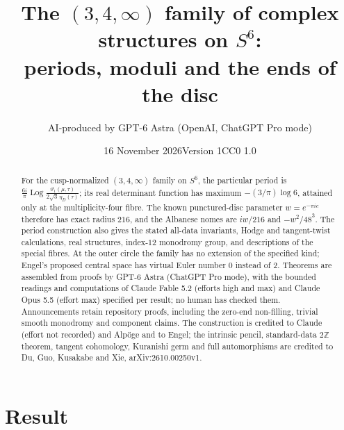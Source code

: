 \documentclass[11pt,a4paper]{article}
\title{The $(3,4,\infty)$ family of complex structures on $S^6$:\\periods, moduli and the ends of the disc}
\author{AI-produced by GPT-6 Astra (OpenAI, ChatGPT Pro mode)}
\date{16 November 2026\qquad Version 1\qquad CC0 1.0}
\theoremstyle{plain}
\theoremstyle{definition}
\begin{document}
\maketitle

\begin{abstract}
For the cusp-normalized $(3,4,\infty)$ family on $S^6$, the particular period is $\frac{6i}{\pi}\operatorname{Log}\frac{\vartheta_1(\mu,\tau)}{2\sqrt3\,\eta_D(\tau)}$; its real determinant function has maximum $-(3/\pi)\log6$, attained only at the multiplicity-four fibre. The known punctured-disc parameter $w=e^{-\pi ic}$ therefore has exact radius $216$, and the Albanese nomes are $iw/216$ and $-w^2/48^3$. The period construction also gives the stated all-data invariants, Hodge and tangent-twist calculations, real structures, index-$12$ monodromy group, and descriptions of the special fibres. At the outer circle the family has no extension of the specified kind; Engel's proposed central space has virtual Euler number $0$ instead of $2$. Theorems are assembled from proofs by GPT-6 Astra (ChatGPT Pro mode), with the bounded readings and computations of Claude Fable 5.2 (efforts high and max) and Claude Opus 5.5 (effort max) specified per result; no human has checked them. Announcements retain repository proofs, including the zero-end non-filling, trivial smooth monodromy and component claims. The construction is credited to Claude (effort not recorded) and Alp\"oge and to Engel; the intrinsic pencil, standard-data $2\mathbb Z$ theorem, tangent cohomology, Kuranishi germ and full automorphisms are credited to Du, Guo, Kusakabe and Xie, arXiv:2610.00250v1.
\end{abstract}

\section*{Result}
\end{document}
